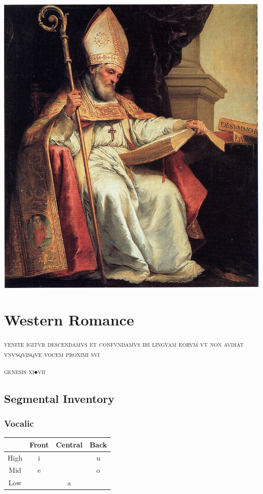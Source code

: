\documentclass{report}[12pt]
\begin{document}
\includegraphics[scale=5.0]{isidorus.jpeg}

\thispagestyle{empty}

\pagebreak

\chapter{Western Romance}\label{cap:western_romance}

\epigraph{\textsc{venite igitvr descendamvs et confvndamvs ibi lingvam eorvm vt non avdiat vnvsqvisqve vocem proximi svi}}{\textsc{genesis} \textsc{xi}$\bullet$\textsc{vii}}

\section{Segmental Inventory}

\subsection{Vocalic}

\begin{tcolorbox}[title=Western Romance Monophthongs, hbox]
  \begin{tabular}{|c|c|c|c|}
    \hline
    & Front & Central & Back \\
    \hline
    High & i & & u \\
    \hline
    Mid & e & & o \\
    \hline
    Low & & a & \\
    \hline
  \end{tabular}
\end{tcolorbox}
\end{document}
